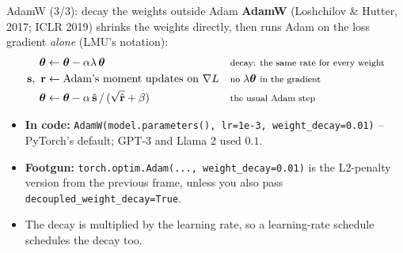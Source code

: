 \documentclass[aspectratio=43]{beamer}
\begin{document}
\begin{frame}{AdamW (3/3): decay the weights outside Adam}
  \small
  \textbf{AdamW} (Loshchilov \& Hutter, 2017; ICLR 2019) shrinks the weights directly, then runs
  Adam on the loss gradient \emph{alone} (LMU's notation):
  \begin{align*}
    \bm\theta &\leftarrow \bm\theta - \alpha\lambda\,\bm\theta
      && \text{\footnotesize decay: the same rate for every weight} \\
    \mathbf{s},\ \mathbf{r} &\leftarrow \text{Adam's moment updates on } \nabla L
      && \text{\footnotesize no } \lambda\bm\theta \text{ \footnotesize in the gradient} \\
    \bm\theta &\leftarrow \bm\theta - \alpha\,\hat{\mathbf{s}} \,/\, (\sqrt{\hat{\mathbf{r}}} + \beta)
      && \text{\footnotesize the usual Adam step}
  \end{align*}
  \begin{itemize}\footnotesize
    \item \textbf{In code:} \texttt{AdamW(model.parameters(), lr=1e-3, weight\_decay=0.01)} --
      PyTorch's default; GPT-3 and Llama 2 used $0.1$.
    \item \textbf{Footgun:} \texttt{torch.optim.Adam(..., weight\_decay=0.01)} is the L2-penalty
      version from the previous frame, unless you also pass \texttt{decoupled\_weight\_decay=True}.
    \item The decay is multiplied by the learning rate, so a learning-rate schedule schedules the
      decay too.
  \end{itemize}
  \vfill
\end{frame}
\end{document}
